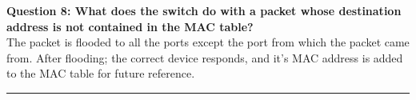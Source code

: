 \documentclass[a4paper,12pt]{article}
\begin{document}
\textbf{Question 8: What does the switch do with a packet whose destination address is not contained in the MAC table?}\\
The packet is flooded to all the ports except the port from which the packet came from. After flooding; the correct device responds, and it's MAC address is added to the MAC table for future reference.



\vspace{1em}
\hrule
\vspace{0.5em}
\end{document}
